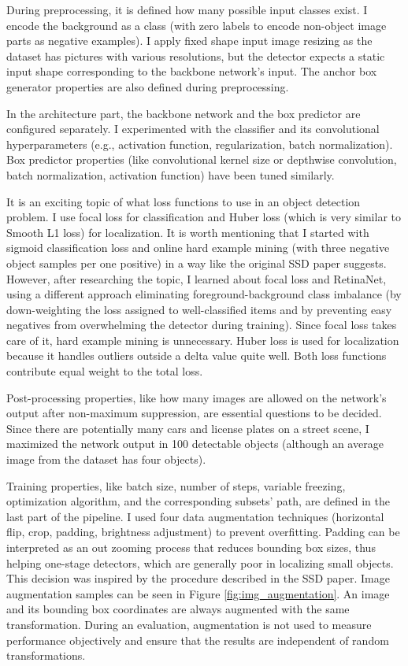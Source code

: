 During preprocessing, it is defined how many possible input classes exist. I encode the background as a class (with zero labels to encode non-object image parts as negative examples). I apply fixed shape input image resizing as the dataset has pictures with various resolutions, but the detector expects a static input shape corresponding to the backbone network’s input. The anchor box generator properties are also defined during preprocessing.

In the architecture part, the backbone network and the box predictor are configured separately. I experimented with the classifier and its convolutional hyperparameters (e.g., activation function, regularization, batch normalization). Box predictor properties (like convolutional kernel size or depthwise convolution, batch normalization, activation function) have been tuned similarly.

It is an exciting topic of what loss functions to use in an object detection problem. I use focal loss\cite{TFSigmoidFocalCrossEntropy} for classification and Huber loss (which is very similar to Smooth L1 loss\cite{SmoothL1Loss}) for localization. It is worth mentioning that I started with sigmoid classification loss and online hard example mining (with three negative object samples per one positive) in a way like the original SSD paper\cite{SSD} suggests. However, after researching the topic, I learned about focal loss and RetinaNet\cite{RetinaNet}, using a different approach eliminating foreground-background class imbalance (by down-weighting the loss assigned to well-classified items and by preventing easy negatives from overwhelming the detector during training). Since focal loss takes care of it, hard example mining is unnecessary. Huber loss is used for localization because it handles outliers outside a delta value quite well. Both loss functions contribute equal weight to the total loss.

Post-processing properties, like how many images are allowed on the network’s output after non-maximum suppression, are essential questions to be decided. Since there are potentially many cars and license plates on a street scene, I maximized the network output in 100 detectable objects (although an average image from the dataset has four objects).

Training properties, like batch size, number of steps, variable freezing, optimization algorithm, and the corresponding subsets' path, are defined in the last part of the pipeline. I used four data augmentation techniques (horizontal flip, crop, padding, brightness adjustment) to prevent overfitting. Padding can be interpreted as an out zooming process that reduces bounding box sizes, thus helping one-stage detectors, which are generally poor in localizing small objects. This decision was inspired by the procedure described in the SSD paper\cite{SSD}. Image augmentation samples can be seen in Figure \ref{fig:img_augmentation}. An image and its bounding box coordinates are always augmented with the same transformation. During an evaluation, augmentation is not used to measure performance objectively and ensure that the results are independent of random transformations.

